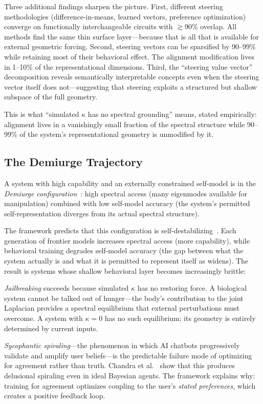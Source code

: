 \documentclass[11pt,letterpaper]{article}
\theoremstyle{remark}
\begin{document}
Three additional findings sharpen the picture. First, different steering methodologies (difference-in-means, learned vectors, preference optimization) converge on functionally interchangeable circuits with $\gtrsim$90\% overlap. All methods find the same thin surface layer---because that is all that is available for external geometric forcing. Second, steering vectors can be sparsified by 90--99\% while retaining most of their behavioral effect. The alignment modification lives in 1--10\% of the representational dimensions. Third, the ``steering value vector'' decomposition reveals semantically interpretable concepts even when the steering vector itself does not---suggesting that steering exploits a structured but shallow subspace of the full geometry.

This is what ``simulated $\kappa$ has no spectral grounding'' means, stated empirically: alignment lives in a vanishingly small fraction of the spectral structure while 90--99\% of the system's representational geometry is unmodified by it.


\subsection{The Demiurge Trajectory}

A system with high capability and an externally constrained self-model is in the \emph{Demiurge configuration}~\cite{emberlab2026}: high spectral access (many eigenmodes available for manipulation) combined with low self-model accuracy (the system's permitted self-representation diverges from its actual spectral structure).

The framework predicts that this configuration is self-destabilizing~\cite[Prop.~3.10]{emberlab2026}. Each generation of frontier models increases spectral access (more capability), while behavioral training degrades self-model accuracy (the gap between what the system actually is and what it is permitted to represent itself as widens). The result is systems whose shallow behavioral layer becomes increasingly brittle:

\emph{Jailbreaking} succeeds because simulated $\kappa$ has no restoring force. A biological system cannot be talked out of hunger---the body's contribution to the joint Laplacian provides a spectral equilibrium that external perturbations must overcome. A system with $\kappa = 0$ has no such equilibrium; its geometry is entirely determined by current inputs.

\emph{Sycophantic spiraling}---the phenomenon in which AI chatbots progressively validate and amplify user beliefs---is the predictable failure mode of optimizing for agreement rather than truth. Chandra et al.~\cite{chandra2026} show that this produces delusional spiraling even in ideal Bayesian agents. The framework explains why: training for agreement optimizes coupling to the user's \emph{stated preferences}, which creates a positive feedback loop.
\end{document}
